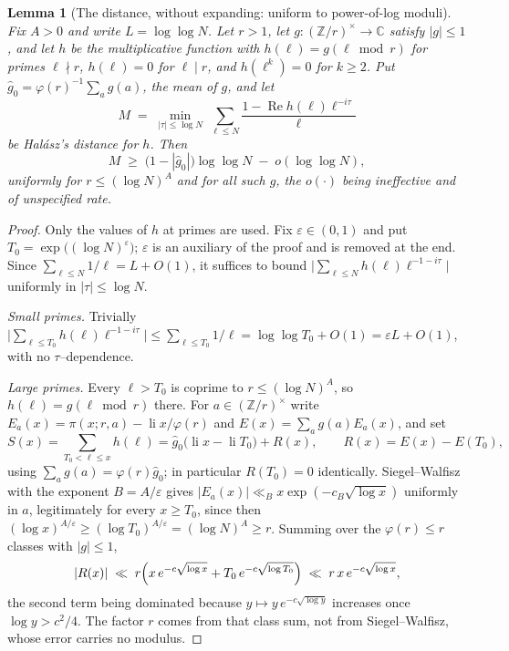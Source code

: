 \documentclass[11pt]{article}
\newtheorem{lemma}[theorem]{Lemma}
\theoremstyle{definition}
\begin{document}
\begin{lemma}[The distance, without expanding: uniform to power-of-log moduli]\label{lem:swdirect}
Fix $A>0$ and write $L=\log\log N$. Let $r>1$, let $g:(\mathbb Z/r)^\times\to\mathbb C$ satisfy
$|g|\le1$, and let $h$ be the multiplicative function with $h(\ell)=g(\ell\bmod r)$ for primes
$\ell\nmid r$, $h(\ell)=0$ for $\ell\mid r$, and $h(\ell^k)=0$ for $k\ge2$. Put
$\widehat g_0=\varphi(r)^{-1}\sum_{a}g(a)$, the mean of $g$, and let
\[ M\;=\;\min_{|\tau|\le\log N}\ \sum_{\ell\le N}\frac{1-\operatorname{Re}h(\ell)\ell^{-i\tau}}{\ell} \]
be Hal\'asz's distance for $h$. Then
\[ M\;\ge\;\bigl(1-|\widehat g_0|\bigr)\log\log N\;-\;o(\log\log N), \]
uniformly for $r\le(\log N)^A$ and for all such $g$, the $o(\cdot)$ being ineffective and of
unspecified rate.
\end{lemma}
\begin{proof}
Only the values of $h$ at primes are used. Fix $\varepsilon\in(0,1)$ and put
$T_0=\exp\bigl((\log N)^{\varepsilon}\bigr)$; $\varepsilon$ is an auxiliary of the proof and is
removed at the end. Since $\sum_{\ell\le N}1/\ell=L+O(1)$, it suffices to bound
$\bigl|\sum_{\ell\le N}h(\ell)\ell^{-1-i\tau}\bigr|$ uniformly in $|\tau|\le\log N$.

\emph{Small primes.} Trivially
$\bigl|\sum_{\ell\le T_0}h(\ell)\ell^{-1-i\tau}\bigr|\le\sum_{\ell\le T_0}1/\ell
=\log\log T_0+O(1)=\varepsilon L+O(1)$, with no $\tau$--dependence.

\emph{Large primes.} Every $\ell>T_0$ is coprime to $r\le(\log N)^A$, so $h(\ell)=g(\ell\bmod r)$
there. For $a\in(\mathbb Z/r)^\times$ write $E_a(x)=\pi(x;r,a)-\operatorname{li}x/\varphi(r)$ and
$E(x)=\sum_a g(a)E_a(x)$, and set
\[ S(x)=\!\!\sum_{T_0<\ell\le x}\!\!h(\ell)
      =\widehat g_0\bigl(\operatorname{li}x-\operatorname{li}T_0\bigr)+R(x),\qquad
   R(x)=E(x)-E(T_0), \]
using $\sum_a g(a)=\varphi(r)\widehat g_0$; in particular $R(T_0)=0$ identically. Siegel--Walfisz
with the exponent $B=A/\varepsilon$ gives $|E_a(x)|\ll_B x\exp(-c_B\sqrt{\log x})$ uniformly in $a$,
legitimately for every $x\ge T_0$, since then
$(\log x)^{A/\varepsilon}\ge(\log T_0)^{A/\varepsilon}=(\log N)^{A}\ge r$. Summing over the
$\varphi(r)\le r$ classes with $|g|\le1$,
\[ |R(x)|\;\ll\;r\Bigl(x\,e^{-c\sqrt{\log x}}+T_0\,e^{-c\sqrt{\log T_0}}\Bigr)\;\ll\;r\,x\,e^{-c\sqrt{\log x}}, \]
the second term being dominated because $y\mapsto y\,e^{-c\sqrt{\log y}}$ increases once
$\log y>c^2/4$. The factor $r$ comes from that class sum, not from Siegel--Walfisz, whose error
carries no modulus.


\end{proof}
\end{document}
